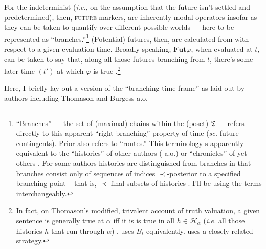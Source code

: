 \documentclass[12pt,dvipsnames]{report}
\begin{document}
For the indeterminist (\textit{i.e.}, on the assumption that the future isn't settled and predetermined), then, \textsc{future} markers, are inherently modal operators insofar as they can be taken to quantify over different possible worlds --- here to be represented as ``branches.''\footnote{``Branches'' --- the set of (maximal) chains within the (poset) $\mathfrak T$ --- refers directly to this apparent ``right-branching'' property of time (\textit{sc.} future contingents). Prior also refers to ``routes.'' This terminology s apparently equivalent to the ``histories'' of other authors (\citealp{Thomason1970,Dowty1977,Tedeschi1981,Belnap2001a} a.o.) or ``chronicles'' of yet others \citep{Øhrstrøm1995}. For some authors histories are distinguished from branches in that branches consist only of sequences of indices $ \prec $-posterior to a specified branching point -- that is, $ \prec $-final subsets of histories \citep[\textit{e.g.},][4]{Zanardo1996}. I'll be using the terms interchangeably.} (Potential) futures, then, are calculated from with respect to a given evaluation time. Broadly speaking, $ \mathbf{Fut} \varphi $, when evaluated at $ t $, can be taken to say that, along all those futures branching from $ t $, there's some later time $ (t') $ at which $ \varphi $ is true \citep[see][267]{Thomason1970}.\footnote{In fact, on Thomason's modified, trivalent account of truth valuation, a given sentence is generally true at $ \alpha $ iff it is is true in all $ h\in\mathcal H_\alpha $ (\textit{i.e.} all those histories $ h $ that run through $ \alpha $) \citeyearpar[274\textit{ff}]{Thomason1970}. \citet{Thomason1984} uses $\mathit B_t $ equivalently. \citet[247]{Tedeschi1981} uses a closely related strategy.} 

Here, I briefly lay out a version of the ``branching time frame'' as laid out by authors including Thomason \citeyearpar[\textit{e.g.},][\S 5]{Thomason1984} and Burgess \citeyearpar[\textit{e.g.},][]{Burgess1978} a.o. 


\end{document}
